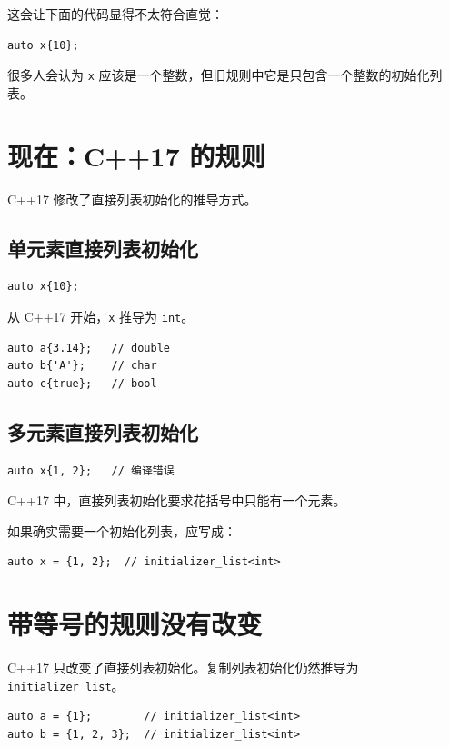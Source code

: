 \documentclass[UTF8,12pt,a4paper]{ctexart}
\begin{document}
这会让下面的代码显得不太符合直觉：

\begin{lstlisting}
auto x{10};
\end{lstlisting}

很多人会认为 \texttt{x} 应该是一个整数，但旧规则中它是只包含一个整数的初始化列表。

\section{现在：C++17 的规则}

C++17 修改了直接列表初始化的推导方式。

\subsection{单元素直接列表初始化}

\begin{lstlisting}
auto x{10};
\end{lstlisting}

从 C++17 开始，\texttt{x} 推导为 \texttt{int}。

\begin{lstlisting}
auto a{3.14};   // double
auto b{'A'};    // char
auto c{true};   // bool
\end{lstlisting}

\subsection{多元素直接列表初始化}

\begin{lstlisting}
auto x{1, 2};   // 编译错误
\end{lstlisting}

C++17 中，直接列表初始化要求花括号中只能有一个元素。

如果确实需要一个初始化列表，应写成：

\begin{lstlisting}
auto x = {1, 2};  // initializer_list<int>
\end{lstlisting}

\section{带等号的规则没有改变}

C++17 只改变了直接列表初始化。复制列表初始化仍然推导为 \texttt{initializer\_list}。

\begin{lstlisting}
auto a = {1};        // initializer_list<int>
auto b = {1, 2, 3};  // initializer_list<int>
\end{lstlisting}
\end{document}
